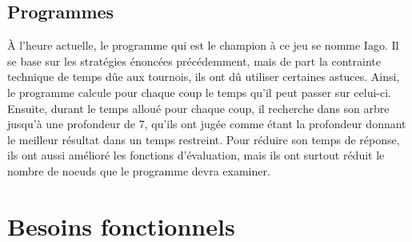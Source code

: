 \documentclass[10pt,a4paper]{article}
\begin{document}
\subsection{Programmes}

À l'heure actuelle, le programme qui est le champion à ce jeu se nomme Iago. Il se base sur les stratégies énoncées précédemment, mais de part la contrainte technique de temps dûe aux tournois, ils ont dû utiliser certaines astuces. Ainsi, le programme calcule pour chaque coup le temps qu'il peut passer sur celui-ci. Ensuite, durant le temps alloué pour chaque coup, il recherche dans son arbre jusqu'à une profondeur de 7, qu'ils ont jugée comme étant la profondeur donnant le meilleur résultat dans un temps restreint. Pour réduire son temps de réponse, ils ont aussi amélioré les fonctions d'évaluation, mais ils ont surtout réduit le nombre de noeuds que le programme devra examiner.
\newpage

\section{Besoins fonctionnels}
\end{document}
